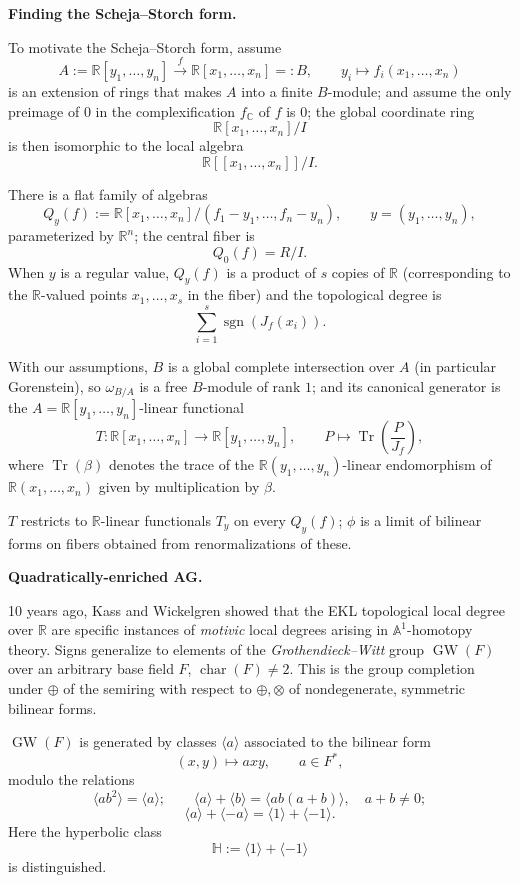 \medskip\noindent
{\bf Finding the Scheja--Storch form.}

To motivate the Scheja--Storch form,
assume
$$
A
:=
\mathbb{R}[y_1,\ldots,y_n]
\xrightarrow{\;f\;}
\mathbb{R}[x_1,\ldots,x_n]
=:
B,
\qquad
y_i\longmapsto f_i(x_1,\ldots,x_n)
$$
is an extension of rings that makes $A$
into a finite $B$-module; and assume the
only preimage of $0$ in the
complexification $f_{\mathbb{C}}$ of $f$
is $0$; the global coordinate ring
$$
\mathbb{R}[x_1,\ldots,x_n]/I
$$
is then isomorphic to the local algebra
$$
\mathbb{R}[[x_1,\ldots,x_n]]/I.
$$

There is a flat family of algebras
$$
Q_y(f)
:=
\mathbb{R}[x_1,\ldots,x_n]
/
(f_1-y_1,\ldots,f_n-y_n),
\qquad
y=(y_1,\ldots,y_n),
$$
parameterized by $\mathbb{R}^n$; the
central fiber is
$$
Q_0(f)=R/I.
$$
When $y$ is a regular value, $Q_y(f)$ is
a product of $s$ copies of $\mathbb{R}$
(corresponding to the $\mathbb{R}$-valued
points $x_1,\ldots,x_s$ in the fiber) and
the topological degree is
$$
\sum_{i=1}^s
\operatorname{sgn}(J_f(x_i)).
$$

With our assumptions, $B$ is a global
complete intersection over $A$
(in particular Gorenstein), so
$\omega_{B/A}$ is a free $B$-module of
rank $1$; and its canonical generator is
the
$A=\mathbb{R}[y_1,\ldots,y_n]$-linear
functional
$$
T\colon
\mathbb{R}[x_1,\ldots,x_n]
\longrightarrow
\mathbb{R}[y_1,\ldots,y_n],
\qquad
P\longmapsto
\operatorname{Tr}\left(\frac{P}{J_f}\right),
$$
where $\operatorname{Tr}(\beta)$ denotes
the trace of the
$\mathbb{R}(y_1,\ldots,y_n)$-linear
endomorphism of
$\mathbb{R}(x_1,\ldots,x_n)$ given by
multiplication by $\beta$.

$T$ restricts to $\mathbb{R}$-linear
functionals $T_y$ on every $Q_y(f)$;
$\phi$ is a limit of bilinear forms on
fibers obtained from renormalizations of
these.

\medskip\noindent
{\bf Quadratically-enriched AG.}

10 years ago, Kass and Wickelgren showed
that the EKL topological local degree over
$\mathbb{R}$ are specific instances of
{\it motivic} local degrees arising in
$\mathbb{A}^1$-homotopy theory.
Signs generalize to elements of the
{\it Grothendieck--Witt} group
$\operatorname{GW}(F)$ over an arbitrary
base field $F$, $\operatorname{char}(F)
\neq 2$.
This is the group completion under
$\oplus$ of the semiring with respect to
$\oplus,\otimes$ of nondegenerate,
symmetric bilinear forms.

$\operatorname{GW}(F)$ is generated by
classes $\langle a\rangle$ associated to
the bilinear form
$$
(x,y)\longmapsto axy,
\qquad
a\in F^*,
$$
modulo the relations
$$
\langle ab^2\rangle=\langle a\rangle;
\qquad
\langle a\rangle+\langle b\rangle
=
\langle ab(a+b)\rangle,
\quad
a+b\neq 0;
$$
$$
\langle a\rangle+\langle-a\rangle
=
\langle1\rangle+\langle-1\rangle.
$$
Here the hyperbolic class
$$
\mathbb{H}
:=
\langle 1\rangle+\langle-1\rangle
$$
is distinguished.

